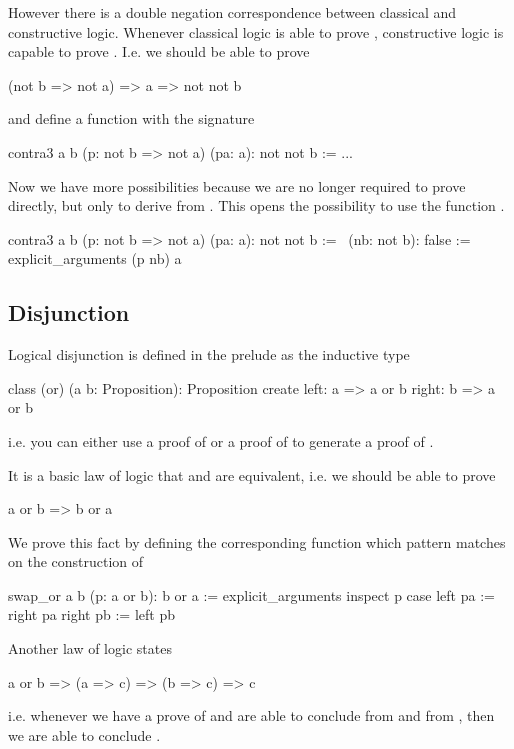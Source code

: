 However there is a double negation correspondence between classical and
constructive logic. Whenever classical logic is able to prove ,
constructive logic is capable to prove . I.e. we should be
able to prove
\begin{alba}
  (not b => not a) => a => not not b
\end{alba}
and define a function with the signature
%
\begin{alba}
  contra3 a b (p: not b => not a) (pa: a): not not b :=
    ...
\end{alba}
%
Now we have more possibilities because we are no longer required to prove
 directly, but only to derive  from . This
opens the possibility to use the function .
%
\begin{alba}
  contra3 a b (p: not b => not a) (pa: a): not not b :=
    \ (nb: not b): false :=
        explicit_arguments
          (p nb) a
\end{alba}



\subsection{Disjunction}

Logical disjunction is defined in the prelude as the inductive type
%
\begin{alba}
  class
    (or) (a b: Proposition): Proposition
  create
    left:  a => a or b
    right: b => a or b
\end{alba}
%
i.e. you can either use a proof of  or a proof of  to generate
a proof of .

It is a basic law of logic that  and  are
equivalent, i.e. we should be able to prove
%
\begin{alba}
  a or b  =>  b or a
\end{alba}
%
We prove this fact by defining the corresponding function which pattern
matches on the construction of 
%
\begin{alba}
  swap_or a b (p: a or b): b or a :=
    explicit_arguments
      inspect
        p
      case
        left  pa := right pa
        right pb := left  pb
\end{alba}

Another law of logic states
\begin{alba}
  a or b  =>  (a => c) => (b => c)  =>  c
\end{alba}
%
i.e. whenever we have a prove of  and are able to conclude
 from  and  from , then we are able to
conclude .


